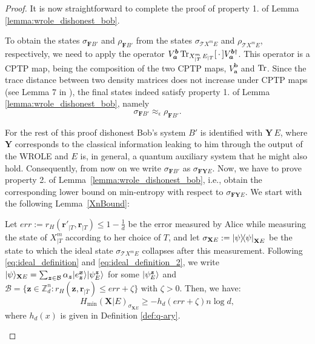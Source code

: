 \begin{proof}
It is now straightforward to complete the proof of property 1. of Lemma \ref{lemma:wrole_dishonest_bob}. 

To obtain the states $\sigma_{\mathbf{F} B'}$ and $\rho_{\mathbf{F} B'}$ from the states $\sigma_{\mathcal{T}X^m E}$ and $\rho_{\mathcal{T}X^m E}$, respectively, we need to apply the operator $V^{\bm{b}}_{\bm{a}}\Tr_{X^m_{|T}\,E_{|T}}[\, \cdot\,] V^{\bm{b} \dagger}_{\bm{a}}$. This operator  is a CPTP map, being the composition of the two CPTP maps, $V^{\bm{b}}_{\bm{a}}$ and $\Tr$. Since the trace distance between two density matrices does not increase under CPTP maps (see Lemma 7 in \cite{U17}), the final states indeed satisfy  property 1. of Lemma \ref{lemma:wrole_dishonest_bob}, namely 
\begin{equation*}
    \sigma_{\mathbf{F} B'} \approx_{\epsilon} \rho_{\mathbf{F} B'}.
\end{equation*}



 For the rest of this proof dishonest Bob's system $B'$ is identified with $\mathbf{Y}\, E$, where $\mathbf{Y}$ corresponds to the classical information leaking to him through the output of the WROLE and $E$ is, in general, a quantum auxiliary system that he might also hold. Consequently, from now on we write $\sigma_{\mathbf{F} B'}$ as $\sigma_{\mathbf{F} \mathbf{Y}E}$. Now, we have to prove property 2. of Lemma~\ref{lemma:wrole_dishonest_bob},  i.e., obtain the corresponding lower bound on min-entropy with respect to $\sigma_{\mathbf{F} \mathbf{Y}E}$. 
  We start with  the following Lemma~\ref{XnBound}:


 \begin{lemma}
\label{XnBound}
Let $err := r_H(\boldsymbol{r'}_{|T}, \boldsymbol{r}_{|T}) \leq 1-\frac{1}{d}$ be the error measured by Alice  while measuring the state of $X^m_{|T}$ according to her choice of $T$, and let $\sigma_{\mathbf{X} E} := \ketbra{\psi}_{\mathbf{X} E}$ be the state to which the ideal state $\sigma_{\mathcal{T}X^m E}$ collapses after this measurement. Following \eqref{eq:ideal_definition} and \eqref{eq:ideal_definition_2}, we  write  $| \psi \rangle_{\mathbf{X} E} = \sum_{\boldsymbol{z}\in \mathcal{B}} \alpha_{\boldsymbol{z}}| e^{\boldsymbol{x}}_{\boldsymbol{z}} \rangle | \psi^{\boldsymbol{z}}_{E} \rangle$  for some $| \psi^{\boldsymbol{z}}_{E} \rangle$ and  $\mathcal{B} = \{ \boldsymbol{z}\in \mathbb{Z}_d^{n}: r_H(\boldsymbol{z}, \boldsymbol{r}_{|\bar{T}})\leq err + \zeta \}$ with $\zeta>0$. Then, we have: 
\begin{equation}
H_{\min}(\mathbf{X}|E)_{\sigma_{\mathbf{X} E}} \geq -h_d(err + \zeta) n\log d,
\label{eq:min_entropy_1_stage}
\end{equation}
where $h_d(x)$ is given in Definition \ref{def:q-ary}.


\end{lemma}
\end{proof}
